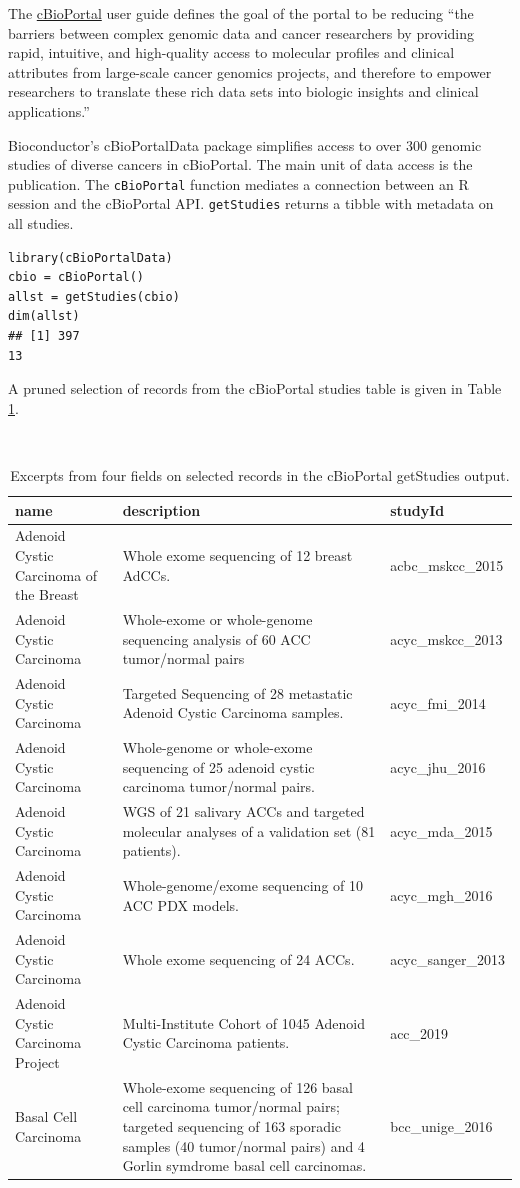 The \href{https://www.cbioportal.org/}{cBioPortal} user guide
defines the goal of the portal to be reducing ``the barriers between complex
genomic data and cancer researchers by providing rapid, intuitive, and high-quality
access to molecular profiles and clinical attributes from large-scale cancer genomics projects, and
therefore to empower researchers to translate these rich data sets into biologic insights and clinical applications.''

Bioconductor's cBioPortalData package simplifies access to over 300 genomic studies of
diverse cancers in cBioPortal. The main unit of data access is the publication. The
\texttt{cBioPortal} function mediates a connection between an R session and the
cBioPortal API. \texttt{getStudies} returns a tibble with metadata on
all studies.

\begin{Shaded}
\begin{verbatim}
library(cBioPortalData)
cbio = cBioPortal()
allst = getStudies(cbio)
dim(allst)
## [1] 397
13
\end{verbatim}
\end{Shaded}

A pruned selection of records from the cBioPortal
studies table is given in Table \ref{tab:tab-cball}.

\begin{table}
\caption{\label{tab:tab-cball}Excerpts from four fields on selected records in the cBioPortal getStudies output.}\\
\begin{tabular}{p{5cm}p{5cm}l}
name & description & studyId \\ \hline
Adenoid Cystic Carcinoma of the Breast & Whole exome sequencing of 12 breast AdCCs. & acbc\_mskcc\_2015 \\
Adenoid Cystic Carcinoma & Whole-exome or whole-genome sequencing analysis of 60 ACC tumor/normal pairs & acyc\_mskcc\_2013 \\
Adenoid Cystic Carcinoma & Targeted Sequencing of 28 metastatic Adenoid Cystic Carcinoma samples. & acyc\_fmi\_2014 \\
Adenoid Cystic Carcinoma & Whole-genome or whole-exome sequencing of 25 adenoid cystic carcinoma tumor/normal pairs. & acyc\_jhu\_2016 \\
Adenoid Cystic Carcinoma & WGS of 21 salivary ACCs and targeted molecular analyses of a validation set (81 patients). & acyc\_mda\_2015 \\
Adenoid Cystic Carcinoma & Whole-genome/exome sequencing of 10 ACC PDX models. & acyc\_mgh\_2016 \\
Adenoid Cystic Carcinoma & Whole exome sequencing of 24 ACCs. & acyc\_sanger\_2013 \\
Adenoid Cystic Carcinoma Project & Multi-Institute Cohort of 1045 Adenoid Cystic Carcinoma patients. & acc\_2019 \\
Basal Cell Carcinoma & Whole-exome sequencing of 126 basal cell carcinoma tumor/normal pairs; targeted sequencing of 163 sporadic samples (40 tumor/normal pairs) and 4 Gorlin symdrome basal cell carcinomas. & bcc\_unige\_2016 \\
\end{tabular}
\end{table}

